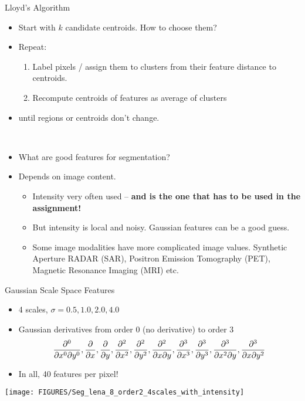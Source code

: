 \documentclass[9pt]{beamer}
\begin{document}
\begin{frame}[t]{Lloyd's Algorithm}
  \begin{itemize}
  \item Start with $k$ candidate centroids. How to choose them?
  \item Repeat:
    \begin{enumerate}
    \item Label pixels / assign them to clusters from their feature distance to centroids.
    \item Recompute centroids of features as average of clusters
    \end{enumerate}
  \item until regions or centroids don't change.
  \end{itemize}
  ~\\
  \begin{itemize}
  \item What are good features for segmentation?
  \item Depends on image content.
    \begin{itemize}
    \item Intensity very often used -- \textbf{and is the one that has to be used in the assignment!}
    \item But intensity is local and noisy. Gaussian features can be a good guess.
    \item Some image modalities have more complicated image values. Synthetic Aperture
      RADAR (SAR), Positron Emission Tomography (PET), Magnetic Resonance Imaging (MRI) etc.
    \end{itemize}
  \end{itemize}
\end{frame}


\begin{frame}[t]{Gaussian Scale Space Features}
  \begin{itemize}
  \item 4 scales, $\sigma = 0.5, 1.0, 2.0, 4.0$
  \item Gaussian derivatives from order 0 (no derivative) to order 3
    $$
    \frac{\partial^{0}{}}{\partial{x^0\partial
      y^0}},\frac{\partial{}}{\partial{x}},\frac{\partial{}}{\partial{y}},\frac{\partial^{2}{}}{\partial{x^2}},\frac{\partial^{2}{}}{\partial{y^2}},\frac{\partial^{2}{}}{\partial{x\partial
      y}},\frac{\partial^{3}{}}{\partial{x^3}},\frac{\partial^{3}{}}{\partial{y^3}},\frac{\partial^{3}{}}{\partial{x^2\partial
      y}},\frac{\partial^{3}{}}{\partial{x\partial y^2}}
    $$
  \item In all, 40 features per pixel!
  \end{itemize}
  
  \begin{center}
    \texttt{[image: FIGURES/Seg\_lena\_8\_order2\_4scales\_with\_intensity]}
  \end{center}
 
  
\end{frame}
\end{document}
